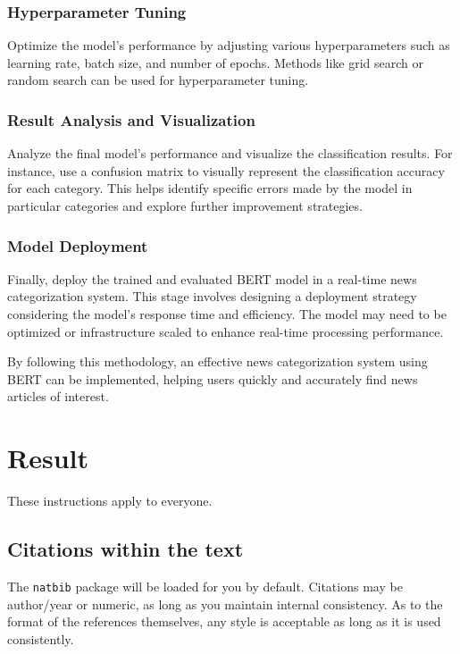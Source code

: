\documentclass{article}
\begin{document}
\subsubsection{Hyperparameter Tuning}
Optimize the model's performance by adjusting various hyperparameters such as learning rate, batch size, and number of epochs. Methods like grid search or random search can be used for hyperparameter tuning.

\subsubsection{Result Analysis and Visualization}
Analyze the final model's performance and visualize the classification results. For instance, use a confusion matrix to visually represent the classification accuracy for each category. This helps identify specific errors made by the model in particular categories and explore further improvement strategies.

\subsubsection{Model Deployment}
Finally, deploy the trained and evaluated BERT model in a real-time news categorization system. This stage involves designing a deployment strategy considering the model's response time and efficiency. The model may need to be optimized or infrastructure scaled to enhance real-time processing performance.

By following this methodology, an effective news categorization system using BERT can be implemented, helping users quickly and accurately find news articles of interest.


\section{Result}
\label{others}

These instructions apply to everyone.

\subsection{Citations within the text}

The \verb+natbib+ package will be loaded for you by default.  Citations may be
author/year or numeric, as long as you maintain internal consistency.  As to the
format of the references themselves, any style is acceptable as long as it is
used consistently.
\end{document}

